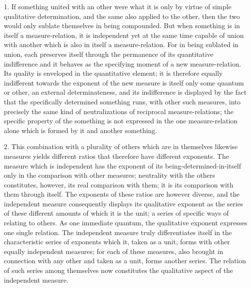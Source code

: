 1. If something united with an other were what it is
only by virtue of simple qualitative determination,
and the same also applied to the other,
then the two would only sublate themselves in being compounded.
But when something is in itself a measure-relation,
it is independent yet at the same time capable of
union with another which is also in itself a measure-relation.
For in being sublated in union, each preserves itself
through the permanence of its quantitative indifference
and it behaves as the specifying moment of a new measure-relation.
Its quality is enveloped in the quantitative element;
it is therefore equally indifferent towards
the exponent of the new measure
is itself only some quantum or other,
an external determinateness,
and its indifference is displayed by the fact
that the specifically determined something runs,
with other such measures,
into precisely the same kind of neutralizations
of reciprocal measure-relations;
the specific property of the something is
not expressed in the one measure-relation alone
which is formed by it and another something.

2. This combination with a plurality of others
which are in themselves likewise measures yields different ratios
that therefore have different exponents.
The measure which is independent has the exponent of its
being-determined-in-itself only in the comparison with other measures;
neutrality with the others constitutes,
however, its real comparison with them;
it is its comparison with them through itself.
The exponents of these ratios are however diverse,
and the independent measure consequently displays
its qualitative exponent as the series of
these different amounts of which it is the unit;
a series of specific ways of relating to others.
As one immediate quantum, the qualitative exponent
expresses one single relation.
The independent measure truly differentiates itself
in the characteristic series of exponents
which it, taken as a unit, forms with
other equally independent measures;
for each of these measures, also brought in connection with
any other and taken as a unit, forms another series.
The relation of such series among themselves now constitutes
the qualitative aspect of the independent measure.


